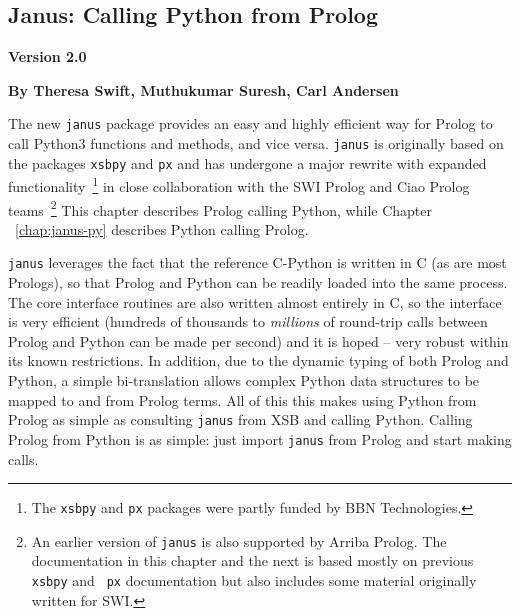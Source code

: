 \newcommand{\janus}{{\tt janus}}
\newcommand{\janusplg}{\texttt{janus-plg}}
\newcommand{\januspy}{\texttt{janus-py}}
\newcommand{\janusxsb}{\texttt{janus\_xsb}}
\newcommand{\jnsversion}{Version 2.0}

\begin{center}
\chapter[Janus: Prolog calling Python]{Janus: Calling Python from Prolog} \label{chap:januspy}
\end{center}

\vspace*{-.30in} 
\begin{center}
{\Large {\bf  \jnsversion}}
\end{center}

\begin{center}
  {\Large {\bf By Theresa Swift, Muthukumar Suresh, Carl Andersen}}
\end{center}

\noindent

%

The new \janus{} package provides an easy and highly efficient way for
Prolog to call Python3 functions and methods, and vice versa.  \janus{}
is originally based on the packages {\tt xsbpy} and {\tt px}
\cite{SwiA23,AndS23} and has undergone a major rewrite with expanded
functionality~\footnote{The {\tt xsbpy} and {\tt px} packages were
partly funded by BBN Technologies.} in close collaboration with the
SWI Prolog and Ciao Prolog teams~\footnote{An earlier version of \janus{}
is also supported by Arriba Prolog. The documentation in this
chapter and the next is based mostly on previous {\tt xsbpy} and {\tt
  px} documentation but also includes some material originally written
for SWI.} This chapter describes Prolog calling Python, while Chapter
~\ref{chap:janus-py}  describes Python calling Prolog.

\janus{} leverages the fact that the reference C-Python is written in
C (as are most Prologs), so that Prolog and Python can be readily
loaded into the same process. The core interface routines are also
written almost entirely in C, so the interface is very efficient
(hundreds of thousands to {\em millions} of round-trip calls between
Prolog and Python can be made per second) and it is hoped -- very
robust within its known restrictions.  In addition, due to the dynamic
typing of both Prolog and Python, a simple bi-translation allows
complex Python data structures to be mapped to and from Prolog terms.
All of this this makes using Python from Prolog as simple as
consulting \janus{} from XSB and calling Python.  Calling Prolog from
Python is as simple: just import \janus{} from Prolog and start making
calls.

